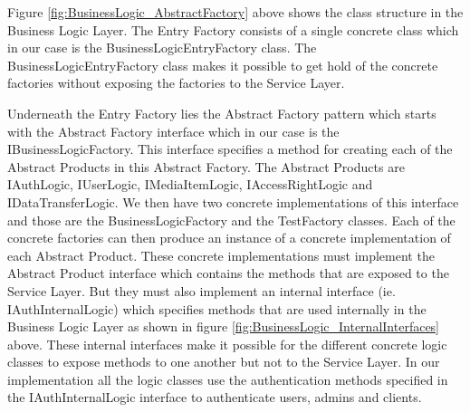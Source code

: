 \documentclass[../report.tex]{subfiles}
\begin{document}


\restoregeometry

Figure \ref{fig:BusinessLogic_AbstractFactory} above shows the class structure in the Business Logic Layer. The Entry Factory consists of a single concrete class which in our case is the BusinessLogicEntryFactory class. The BusinessLogicEntryFactory class makes it possible to get hold of the concrete factories without exposing the factories to the Service Layer.

Underneath the Entry Factory lies the Abstract Factory pattern which starts with the Abstract Factory interface which in our case is the IBusinessLogicFactory. This interface specifies a method for creating each of the Abstract Products in this Abstract Factory. The Abstract Products are IAuthLogic, IUserLogic, IMediaItemLogic, IAccessRightLogic and IDataTransferLogic. We then have two concrete implementations of this interface and those are the BusinessLogicFactory and the TestFactory classes. Each of the concrete factories can then produce an instance of a concrete implementation of each Abstract Product. These concrete implementations must implement the Abstract Product interface which contains the methods that are exposed to the Service Layer. But they must also implement an internal interface (ie. IAuthInternalLogic) which specifies methods that are used internally in the Business Logic Layer as shown in figure \ref{fig:BusinessLogic_InternalInterfaces} above. These internal interfaces make it possible for the different concrete logic classes to expose methods to one another but not to the Service Layer. In our implementation all the logic classes use the authentication methods specified in the IAuthInternalLogic interface to authenticate users, admins and clients.
\end{document}
